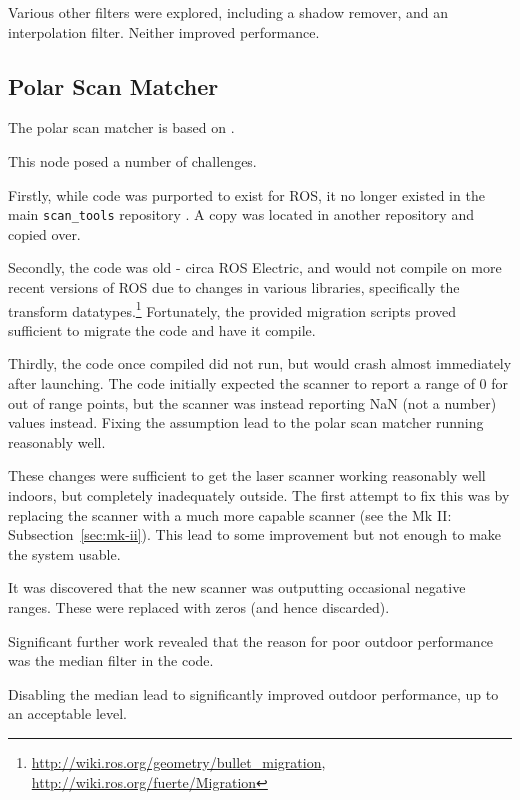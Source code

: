 \documentclass[12pt,oneside,a4paper]{book}
\begin{document}
Various other filters were explored, including a shadow remover, and
an interpolation filter. Neither improved performance.

\subsection{Polar Scan Matcher}
\label{sec:polar-scan-matcher}

The polar scan matcher is based on .

This node posed a number of challenges.

Firstly, while code was purported to exist for ROS, it no longer
existed in the main \texttt{scan\_tools} repository . A copy was located in another repository and copied
over.

Secondly, the code was old - circa ROS Electric, and would not compile on more recent
versions of ROS due to changes in various libraries, specifically the
transform datatypes.\footnote{
  \url{http://wiki.ros.org/geometry/bullet_migration},
  \url{http://wiki.ros.org/fuerte/Migration}} Fortunately, the
provided migration scripts proved sufficient to migrate the code and
have it compile.

Thirdly, the code once compiled did not run, but would crash almost
immediately after launching. The code initially expected the scanner
to report a range of 0 for out of range points, but the scanner was
instead reporting NaN (not a number) values instead. Fixing the
assumption lead to the polar scan matcher running reasonably well.

These changes were sufficient to get the laser scanner working
reasonably well indoors, but completely inadequately outside. The
first attempt to fix this was by replacing the scanner with a much
more capable scanner (see the Mk II: Subsection~\ref{sec:mk-ii}). This
lead to some improvement but not enough to make the system usable.

It was discovered that the new scanner was outputting occasional
negative ranges. These were replaced with zeros (and hence discarded).

Significant further work revealed that the reason for poor outdoor
performance was the median filter in the code.


Disabling the median lead to significantly improved outdoor
performance, up to an acceptable level.
\end{document}
